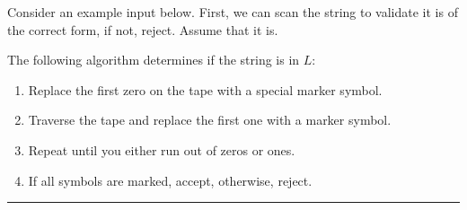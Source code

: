 \documentclass[twoside]{article}
\newenvironment{proof}{{\bf Proof:}}{\hfill\rule{2mm}{2mm}}
\begin{document}
\begin{proof}
	
	
	Consider an example input below.  First, we can scan the string to validate it is of the correct form, if not, reject.  Assume that it is.
	\begin{center}
		

	
		\end{center}
	
	The following algorithm determines if the string is in $L$:
	
	\begin{enumerate}
		\item[] Replace the first zero on the tape with a special marker symbol.
		\item[] Traverse the tape and replace the first one with a marker symbol.
		\item[] Repeat until you either run out of zeros or ones.
		
	
		
		\item[] If all symbols are marked, accept, otherwise, reject.
	\end{enumerate}
	

\end{proof}
\end{document}

